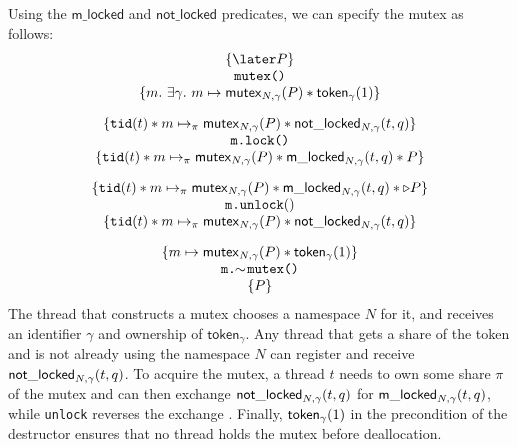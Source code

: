 Using the $\mathsf{m\_locked}$ and $\mathsf{not\_locked}$ predicates, we can specify the mutex as follows:
\[\begin{array}{c}
\{\later P\}\\ \texttt{mutex()}\\ \{m.\ \exists \gamma.\ m \mapsto \mutex{N, \gamma}{P} \ast \token{\gamma}{1}\} \vspace{1em}\\\{\currentthread{t} \ast m \mapsto_\pi \mutex{N, \gamma}{P}\ast\notlocked{N, \gamma}{t}{q}\}\\ {\texttt{m.lock()}} \\ \{\currentthread{t} \ast m \mapsto_\pi \mutex{N, \gamma}{P}\ast\locked{N, \gamma}{t}{q}\ast P\}  \vspace{1em}\\
    \{\currentthread{t} \ast m \mapsto_\pi \mutex{N, \gamma}{P}\ast\locked{N, \gamma}{t}{q}
      \ast\triangleright P\}\\ {\texttt{m.unlock}()}\\
    \{\currentthread{t} \ast m \mapsto_\pi \mutex{N, \gamma}{P}\ast\notlocked{N, \gamma}{t}{q}\}  \vspace{1em} \\
\{m \mapsto \mutex{N, \gamma}{P} \ast \token{\gamma}{1}\}\\ \texttt{m.}\!\!\sim\!\texttt{mutex()}\\ \{P\}
\end{array}\]%
The thread that constructs a mutex chooses a namespace $N$ for it, and receives an identifier $\gamma$ and ownership of $\mathsf{token}_\gamma$. Any thread that gets a share of the token and is not already using the namespace $N$ can register and receive $\mathsf{not\_locked}_{N, \gamma}(t, q)$. To acquire the mutex, a thread $t$ needs to own some share $\pi$ of the mutex and can then exchange $\mathsf{not\_locked}_{N, \gamma}(t, q)$ for $\mathsf{m\_locked}_{N, \gamma}(t, q)$, while \lstinline{unlock} reverses the exchange%
. Finally, $\mathsf{token}_{\gamma}(1)$ in the precondition of the destructor ensures that no thread holds the mutex before deallocation.

